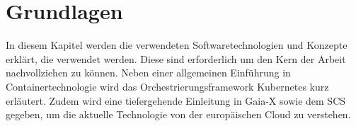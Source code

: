 \chapter{Grundlagen}
\label{chap:grundlagen}

In diesem Kapitel werden die verwendeten Softwaretechnologien und Konzepte erklärt,
die verwendet werden. Diese sind erforderlich um den Kern der Arbeit nachvollziehen zu können.
Neben einer allgemeinen Einführung in Containertechnologie wird das Orchestrierungsframework Kubernetes kurz erläutert.
Zudem wird eine tiefergehende Einleitung in Gaia-X sowie dem \ac{SCS} gegeben,
um die aktuelle Technologie von der europäischen Cloud zu verstehen.
